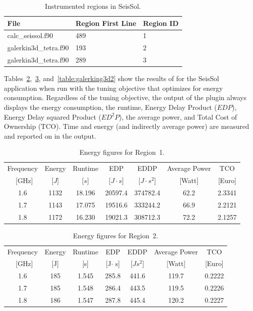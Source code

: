 \begin{table}[htpbH]
\centering
\begin{tabular}{|l|l|l|}
\hline
File & Region First Line & Region ID\\\hline
calc\_seissol.f90 & 489 & 1\\
galerkin3d\_tetra.f90 & 193 & 2 \\
galerkin3d\_tetra.f90 & 289 & 3\\\hline
\end{tabular}
	\caption{Instrumented regions in SeisSol.}
	\label{table:regions}
\end{table}

Tables~\ref{table:calcseis},~\ref{table:galerking3d1}, and~\ref{table:galerking3d2} show the results of for the SeisSol application when run with the tuning objective that optimizes
for energy consumption. Regardless of the tuning objective, the output of the plugin always displays the energy consumption, the runtime, Energy Delay Product ($EDP$), Energy Delay squared Product ($ED^2P$), the average power, and Total Cost of Ownership (TCO). Time and energy (and indirectly average power) are measured and reported on in the output.

\begin{table}[htpbH]
\centering
\begin{tabular}{|c |c |c |c |c |c |c|}
\hline
Frequency & Energy & Runtime & EDP           & EDDP            & Average Power & TCO \\
~[GHz]  & [$J$]  & [$s$]   &  [$J\cdot s$] & [$J\cdot s^2$]  & [Watt]        & [Euro] \\
\hline\hline
1.6       & 1132   & 18.196  & 20597.4    & 374782.4  & 62.2       & 2.3341\\
1.7       & 1143   & 17.075  & 19516.6    & 333244.2  & 66.9       & 2.2121\\
1.8       & 1172   & 16.230  & 19021.3    & 308712.3  & 72.2       & 2.1257\\
\hline
\end{tabular}
	\caption{Energy figures for Region~1.}
	\label{table:calcseis}
\end{table}

\begin{table}[htpbH]
\centering
\begin{tabular}{|c |c |c |c |c |c |c|}
\hline
Frequency & Energy & Runtime & EDP          & EDDP      & Average Power & TCO \\
~[GHz]  & [J]  & [s]   & [J$\cdot$ s] & [$Js^2$]  & [Watt]        & [Euro] \\
\hline\hline
1.6       & 185   & 1.545  & 285.8    & 441.6  & 119.7       & 0.2222\\
1.7       & 185   & 1.548  & 286.4    & 443.5  & 119.5       & 0.2226\\
1.8       & 186   & 1.547  & 287.8    & 445.4  & 120.2       & 0.2227\\
\hline
\end{tabular}
	\caption{Energy figures for Region~2.}
	\label{table:galerking3d1}
\end{table}

